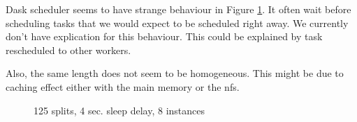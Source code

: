 \documentclass[11pt,a4paper]{article}
\begin{document}
Dask scheduler seems to have strange behaviour in Figure \ref{fig:inc_gantt}. It
often wait before scheduling tasks that we would expect to be scheduled right away.
We currently don't have explication for this behaviour. This could be explained by
task rescheduled to other workers.

Also, the same length does not seem to be homogeneous. This might be due to caching
effect either with the main memory or the nfs.

\begin{figure}[p]
    \centering
    
    \caption{125 splits, 4 sec. sleep delay, 8 instances}
    \label{fig:inc_gantt}
\end{figure}
\end{document}

